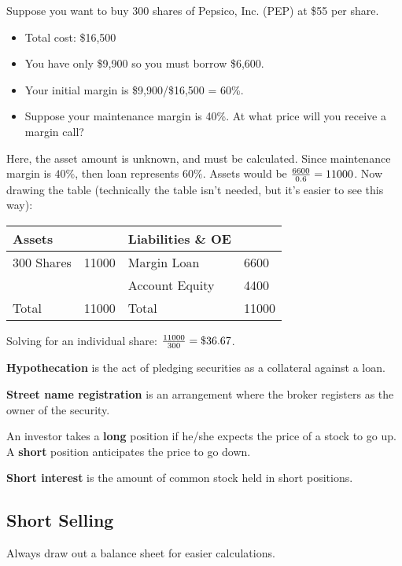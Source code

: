 \documentclass[english, 12pt]{article}
\begin{document}
\begin{exmp}
Suppose you want to buy 300 shares of Pepsico, Inc. (PEP) at \$55 per share.
\begin{itemize}
\item Total cost: \$16,500
\item You have only \$9,900 so you must borrow \$6,600. 
\item Your initial margin is \$9,900/\$16,500 = 60\%.
\item Suppose your maintenance margin is 40\%. At what price will you receive a margin call?
\end{itemize}
\begin{sol}
Here, the asset amount is unknown, and must be calculated. Since maintenance margin is $40\%$, then loan represents $60\%$. Assets would be $\frac{6600}{0.6} = 11000$. Now drawing the table (technically the table isn't needed, but it's easier to see this way):
\begin{center}
\begin{tabular}{|ll|ll|}
\hline
Assets & & Liabilities \& OE & \\
\hline
300 Shares &{\color{red} 11000} & Margin Loan & 6600 \\
& & Account Equity & {\color{red} 4400} \\
\hline
Total & {\color{red} 11000} & Total & {\color{red} 11000}\\
\hline
\end{tabular}
\end{center}
Solving for an individual share: $\frac{11000}{300} = \$36.67$.
\end{sol}
\end{exmp}
\begin{defn}
\textbf{Hypothecation} is the act of pledging securities as a collateral against a loan.
\end{defn}
\begin{defn}
\textbf{Street name registration} is an arrangement where the broker registers as the owner of the security.
\end{defn}
\begin{defn}
An investor takes a \textbf{long} position if he/she expects the price of a stock to go up. A \textbf{short} position anticipates the price to go down.
\end{defn}
\begin{defn}
\textbf{Short interest} is the amount of common stock held in short positions.
\end{defn}

\subsection{Short Selling}
\begin{qte} 
Always draw out a balance sheet for easier calculations.
\end{qte}
\end{document}
